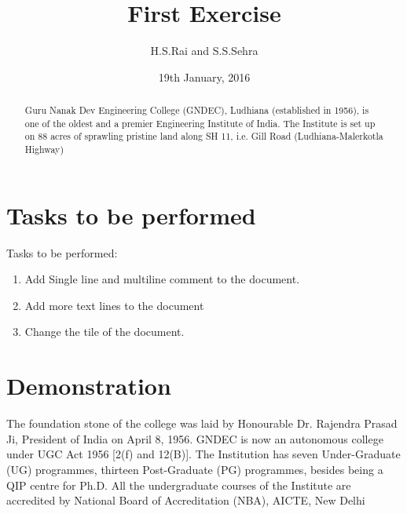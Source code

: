 \documentclass[12pt, letterpaper, twoside]{article}
\title{First Exercise}
\author{H.S.Rai and S.S.Sehra}
\date{19th January, 2016}
\begin{document}
\maketitle
\section*{Tasks to be performed}
Tasks to be performed:
\begin{enumerate}
	\item Add Single line and multiline comment to the document.
    \item  Add more text lines to the document
    \item Change the tile of the document.
\end{enumerate}
\section*{Demonstration}
\begin{abstract}
Guru Nanak Dev Engineering College (GNDEC), Ludhiana (established in
1956), is one of the oldest and a premier Engineering Institute of India. The
Institute is set up on 88 acres of sprawling pristine land along SH 11, i.e. Gill
Road (Ludhiana-Malerkotla Highway)
\end{abstract}

 The foundation stone of the college
 was laid by Honourable Dr. Rajendra Prasad Ji, President of India on April 8,
 1956. GNDEC is now an autonomous college under UGC Act 1956 [2(f) and
 12(B)]. The Institution has seven Under-Graduate (UG) programmes,
 thirteen Post-Graduate (PG) programmes, besides being a QIP centre for
 Ph.D. All the undergraduate courses of the Institute are accredited by
 National Board of Accreditation (NBA), AICTE, New Delhi
 
\begin{comment}
This text won't show up in the compiled pdf
this is just a multi-line comment. Useful
to, for instance, comment out slow-rendering
while working on the draft.
\end{comment}
\end{document}
